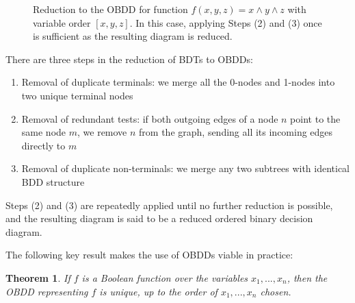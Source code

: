 \documentclass[11pt]{article}
\newtheorem{theorem}{Theorem}[section]
\begin{document}
\begin{figure}

\label{bdd_reduction_example}
\caption{Reduction to the OBDD for function $f(x, y, z) = x \land y \land z$ with variable order $[x, y, z]$. In this case, applying Steps (2) and (3) once is sufficient as the resulting diagram is reduced.}
\end{figure}
\noindent There are three steps in the reduction of BDTs to OBDDs:
\begin{enumerate}
\item Removal of duplicate terminals: we merge all the 0-nodes and 1-nodes into two unique terminal nodes
\item Removal of redundant tests: if both outgoing edges of a node $n$ point to the same node $m$, we remove $n$ from the graph, sending all its incoming edges directly to $m$ 
\item Removal of duplicate non-terminals: we merge any two subtrees with identical BDD structure
\end{enumerate}
Steps (2) and (3) are repeatedly applied until no further reduction is possible, and the resulting diagram is said to be a reduced ordered binary decision diagram. 




The following key result makes the use of OBDDs viable in practice: 

\begin{theorem} \cite{bryant}
\label{obdd_uniqueness}
If $f$ is a Boolean function over the variables $x_1, ..., x_n$, then the OBDD representing $f$ is unique, up to the order of $x_1, ..., x_n$ chosen.
\end{theorem}
\end{document}
